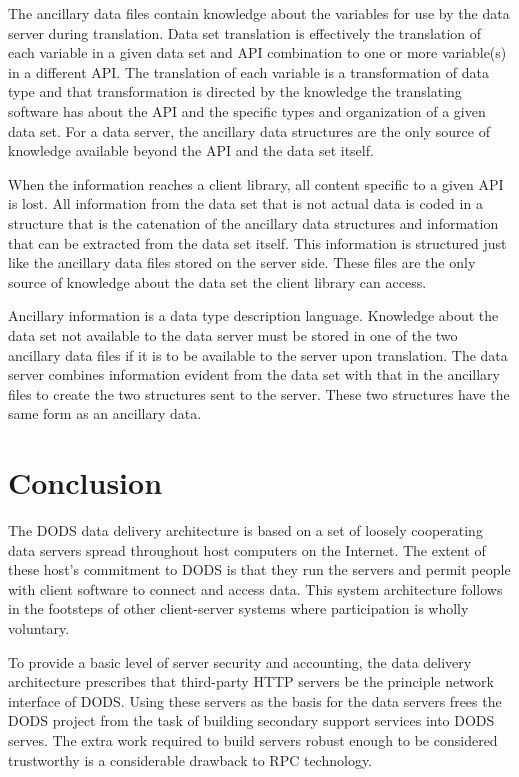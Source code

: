 The ancillary data files contain knowledge about the variables for use by the
data server during translation.  Data set translation is effectively the
translation of each variable in a given data set and API combination to one
or more variable(s) in a different API\@. The translation of each variable is a
transformation of data type and that transformation is directed by the
knowledge the translating software has about the API and the specific types
and organization of a given data set. For a data server, the ancillary data
structures are the only source of knowledge available beyond the API and the
data set itself.

When the information reaches a client library, all content specific to a
given API is lost. All information from the data set that is not actual data
is coded in a structure that is the catenation of the ancillary data
structures and information that can be extracted from the data set itself.
This information is structured just like the ancillary data files stored on
the server side. These files are the only source of knowledge about the data
set the client library can access.

Ancillary information is a data type description language. Knowledge about
the data set not available to the data server must be stored in one of the
two ancillary data files if it is to be available to the server upon
translation. The data server combines information evident from the data set
with that in the ancillary files to create the two structures sent to the
server. These two structures have the same form as an ancillary data.

\section{Conclusion}

The DODS data delivery architecture is based on a set of loosely cooperating
data servers spread throughout host computers on the Internet. The extent of
these host's commitment to DODS is that they run the servers and permit people
with client software to connect and access data. This system
architecture follows in the footsteps of other client-server systems where
participation is wholly voluntary. 

To provide a basic level of server security and accounting, the data delivery
architecture prescribes that third-party HTTP servers be the principle
network interface of DODS\@. Using these servers as the basis for the data
servers frees the DODS project from the task of building secondary support
services into DODS serves. The extra work required to build servers robust
enough to be considered trustworthy is a considerable drawback to RPC
technology.

